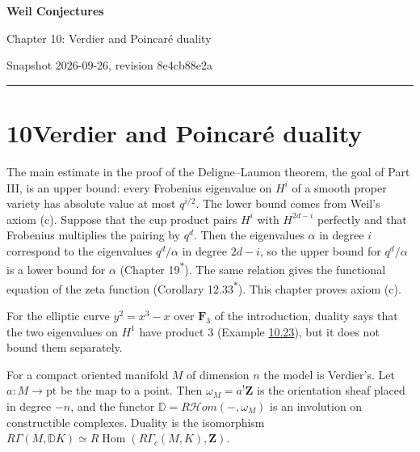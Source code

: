 \documentclass[11pt]{article}
\newcommand{\bpout}[1]{#1\textsuperscript{\hyperlink{bp-outside}{\ensuremath{\ast}}}}
\providecommand{\cHom}{}\renewcommand{\cHom}{R\mathcal{H}\!om}
\begin{document}
\pagestyle{plain}
\begin{center}
{\LARGE\bfseries Weil Conjectures\par}
\vspace{0.7em}
{\large Chapter 10: Verdier and Poincaré duality\par}
\vspace{0.5em}
{\small\color{bpmuted}Snapshot 2026-09-26, revision 8e4cb88e2a\par}
\end{center}
\vspace{0.5em}
{\small\tableofcontents}
\bigskip\hrule\bigskip

\section*{\texorpdfstring{10\quad Verdier and Poincaré duality}{10 Verdier and Poincaré duality}}
\label{bp1}%
\label{bp2}%
The main estimate in the proof of the Deligne–Laumon theorem, the goal of Part III, is an upper bound: every Frobenius eigenvalue on \(H^i\) of a smooth proper variety has absolute value at most \(q^{i/2}\). The lower bound comes from Weil's axiom (c). Suppose that the cup product pairs \(H^i\) with \(H^{2d-i}\) perfectly and that Frobenius multiplies the pairing by \(q^d\). Then the eigenvalues \(\alpha\) in degree \(i\) correspond to the eigenvalues \(q^d/\alpha\) in degree \(2d-i\), so the upper bound for \(q^d/\alpha\) is a lower bound for \(\alpha\) (Chapter \bpout{19}). The same relation gives the functional equation of the zeta function (Corollary \bpout{12.33}). This chapter proves axiom (c).

For the elliptic curve \(y^2=x^3-x\) over \(\mathbf F_3\) of the introduction, duality says that the two eigenvalues on \(H^1\) have product \(3\) (Example \hyperref[bp69]{10.23}), but it does not bound them separately.

For a compact oriented manifold \(M\) of dimension \(n\) the model is Verdier's. Let \(a:M\to\mathrm{pt}\) be the map to a point. Then \(\omega_M=a^!\mathbf Z\) is the orientation sheaf placed in degree \(-n\), and the functor \(\mathbb D=\cHom(-,\omega_M)\) is an involution on constructible complexes. Duality is the isomorphism \(R\Gamma(M,\mathbb DK)\simeq R\!\operatorname{Hom}(R\Gamma_c(M,K),\mathbf Z)\).
\end{document}
